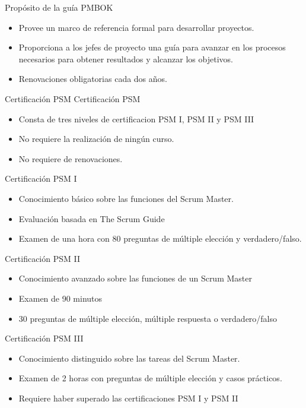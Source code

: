 \begin{frame}[allowframebreaks]{Propósito de la guía PMBOK}
	
	
	
	\begin{itemize}
		\item Provee un marco de referencia formal para desarrollar proyectos. 
		\item Proporciona a los jefes de proyecto una guía para avanzar en los procesos necesarios para obtener resultados y alcanzar los objetivos.
		\item Renovaciones obligatorias cada dos años.
	\end{itemize}

\end{frame}

\begin{frame}[allowframebreaks]{Certificación PSM}
	Certificación PSM 

	\begin{itemize}
		\item Consta de tres niveles de certificacion PSM I, PSM II y PSM III
		\item No requiere la realización de ningún curso.
		\item No requiere de renovaciones.
	\end{itemize}

	\framebreak

	Certificación PSM I
	\begin{itemize}
		\item Conocimiento básico sobre las funciones del Scrum Master.
		\item Evaluación basada en The Scrum Guide
		\item Examen de una hora con 80 preguntas de múltiple elección y verdadero/falso.
	\end{itemize}

	\framebreak

	Certificación PSM II
	\begin{itemize}
		\item Conocimiento avanzado sobre las funciones de un Scrum Master
		\item Examen de 90 minutos
		\item 30 preguntas de múltiple elección, múltiple respuesta o verdadero/falso
	\end{itemize}

	\framebreak

	Certificación PSM III
	\begin{itemize}
		\item Conocimiento distinguido sobre las tareas del Scrum Master.
		\item Examen de 2 horas con preguntas de múltiple elección y casos prácticos.
		\item Requiere haber superado las certificaciones PSM I y PSM II
	\end{itemize}


\end{frame}